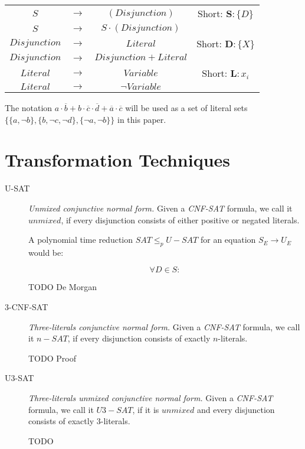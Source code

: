 \documentclass[12pt, letterpaper]{article}
\begin{document}
\begin{description}
{            \begin{tabular}{cccc}
                $S$ & $\rightarrow$& $(Disjunction)$ & \small{Short:} $\mathbf{S}: \{D\}$  \\ 
                $S$ & $\rightarrow$& $S \cdot (Disjunction)$ \\ 
                $Disjunction$ & $\rightarrow$& $Literal$ & \small{Short:} $\mathbf{D}: \{X\}$ \\ 
                $Disjunction$ & $\rightarrow$& $Disjunction + Literal$ \\ 
                $Literal$ & $\rightarrow$& $Variable$ & \small{Short:} $\mathbf{L}: x_i$ \\ 
                $Literal$ & $\rightarrow$& $\lnot Variable$ \\ 
            \end{tabular}

            The notation $a\cdot\overline b + b \cdot\overline c \cdot
            \overline d + \overline a \cdot\overline c$ will be used as 
            a set of literal sets $\{\{a, \lnot b\}, \{b, \lnot c,
            \lnot d\}, \{\lnot a, \lnot b\}\}$ in this paper.
        }
    \end{description}

    \section{Transformation Techniques}

    \begin{description}
        \item[U-SAT] {
            \emph{Unmixed conjunctive normal form.} Given a
            \emph{CNF-SAT} formula, we call it $unmixed$, if
            every disjunction consists of either positive or 
            negated literals.

            A polynomial time reduction $SAT \leq_p U-SAT$
            for an equation $S_E \rightarrow U_E$ would be:

            \[\forall D \in S:\]

            TODO De Morgan
        }
        \item[3-CNF-SAT] {
            \emph{Three-literals conjunctive normal form.} Given a
            \emph{CNF-SAT} formula, we call it $n-SAT$, if
            every disjunction consists of exactly $n$-literals.
            
            TODO Proof
        }
        \item[U3-SAT] {
            \emph{Three-literals unmixed conjunctive normal form.}
            Given a \emph{CNF-SAT} formula, we call it $U3-SAT$, if
            it is $unmixed$ and every disjunction consists of
            exactly $3$-literals.
            
            TODO 
        }
    \end{description}
\end{document}
